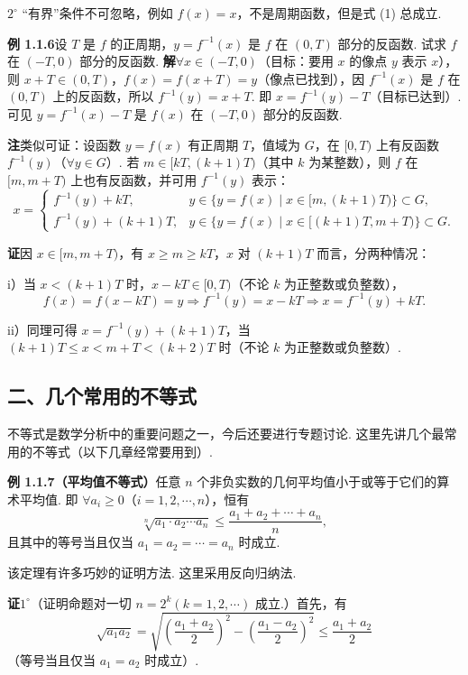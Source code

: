 \documentclass[UTF8, 12pt, fontset=fandol, oneside]{ctexart}
\begin{document}
$2^\circ$ “有界”条件不可忽略，例如 $f(x)=x$，不是周期函数，但是式 (1) 总成立.

\noindent\textbf{例 1.1.6}\quad 设 $T$ 是 $f$ 的正周期，$y=f^{-1}(x)$ 是 $f$ 在 $(0,T)$ 部分的反函数. 试求 $f$ 在 $(-T,0)$ 部分的反函数.
\noindent\textbf{解}\quad $\forall x\in(-T,0)$（目标：要用 $x$ 的像点 $y$ 表示 $x$），则 $x+T\in(0,T)$，$f(x)=f(x+T)=y$（像点已找到），因 $f^{-1}(x)$ 是 $f$ 在 $(0,T)$ 上的反函数，所以 $f^{-1}(y)=x+T$. 即 $x=f^{-1}(y)-T$（目标已达到）. 可见 $y=f^{-1}(x)-T$ 是 $f(x)$ 在 $(-T,0)$ 部分的反函数.

\noindent\textbf{注}\quad 类似可证：设函数 $y=f(x)$ 有正周期 $T$，值域为 $G$，在 $[0,T)$ 上有反函数 $f^{-1}(y)$（$\forall y\in G$）. 若 $m\in[kT,(k+1)T)$（其中 $k$ 为某整数），则 $f$ 在 $[m,m+T)$ 上也有反函数，并可用 $f^{-1}(y)$ 表示：
\[
x=
\begin{cases}
f^{-1}(y)+kT, & y\in\{y=f(x)\mid x\in[m,(k+1)T)\}\subset G,\\
f^{-1}(y)+(k+1)T, & y\in\{y=f(x)\mid x\in[(k+1)T,m+T)\}\subset G.
\end{cases}
\]

\noindent\textbf{证}\quad 因 $x\in[m,m+T)$，有 $x\ge m\ge kT$，$x$ 对 $(k+1)T$ 而言，分两种情况：

i）当 $x<(k+1)T$ 时，$x-kT\in[0,T)$（不论 $k$ 为正整数或负整数），
\[
  f(x)=f(x-kT)=y\Rightarrow f^{-1}(y)=x-kT\Rightarrow x=f^{-1}(y)+kT.
\]

ii）同理可得 $x=f^{-1}(y)+(k+1)T$，当 $(k+1)T\le x<m+T<(k+2)T$ 时（不论 $k$ 为正整数或负整数）.

\subsection*{二、几个常用的不等式}

不等式是数学分析中的重要问题之一，今后还要进行专题讨论. 这里先讲几个最常用的不等式（以下几章经常要用到）.

\noindent\textbf{例 1.1.7（平均值不等式）}\quad 任意 $n$ 个非负实数的几何平均值小于或等于它们的算术平均值. 即 $\forall a_i\ge0$（$i=1,2,\cdots,n$），恒有
\[
  \sqrt[n]{a_1\cdot a_2\cdots a_n}\le\frac{a_1+a_2+\cdots+a_n}{n},
\tag{1}
\]
且其中的等号当且仅当 $a_1=a_2=\cdots=a_n$ 时成立.

该定理有许多巧妙的证明方法. 这里采用反向归纳法.

\noindent\textbf{证}\quad $1^\circ$（证明命题对一切 $n=2^k(k=1,2,\cdots)$ 成立.）首先，有
\[
  \sqrt{a_1a_2}=
  \sqrt{\left(\frac{a_1+a_2}{2}\right)^2-\left(\frac{a_1-a_2}{2}\right)^2}
  \le \frac{a_1+a_2}{2}
\tag{2}
\]
（等号当且仅当 $a_1=a_2$ 时成立）.
\end{document}
